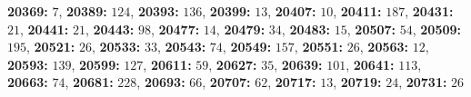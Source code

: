 \textsf{\bfseries 20369:} $7$, \textsf{\bfseries 20389:} $124$, \textsf{\bfseries 20393:} $136$, \textsf{\bfseries 20399:} $13$, \textsf{\bfseries 20407:} $10$, \textsf{\bfseries 20411:} $187$, \textsf{\bfseries 20431:} $21$, \textsf{\bfseries 20441:} $21$, \textsf{\bfseries 20443:} $98$, \textsf{\bfseries 20477:} $14$, \textsf{\bfseries 20479:} $34$, \textsf{\bfseries 20483:} $15$, \textsf{\bfseries 20507:} $54$, \textsf{\bfseries 20509:} $195$, \textsf{\bfseries 20521:} $26$, \textsf{\bfseries 20533:} $33$, \textsf{\bfseries 20543:} $74$, \textsf{\bfseries 20549:} $157$, \textsf{\bfseries 20551:} $26$, \textsf{\bfseries 20563:} $12$, \textsf{\bfseries 20593:} $139$, \textsf{\bfseries 20599:} $127$, \textsf{\bfseries 20611:} $59$, \textsf{\bfseries 20627:} $35$, \textsf{\bfseries 20639:} $101$, \textsf{\bfseries 20641:} $113$, \textsf{\bfseries 20663:} $74$, \textsf{\bfseries 20681:} $228$, \textsf{\bfseries 20693:} $66$, \textsf{\bfseries 20707:} $62$, \textsf{\bfseries 20717:} $13$, \textsf{\bfseries 20719:} $24$, \textsf{\bfseries 20731:} $26$